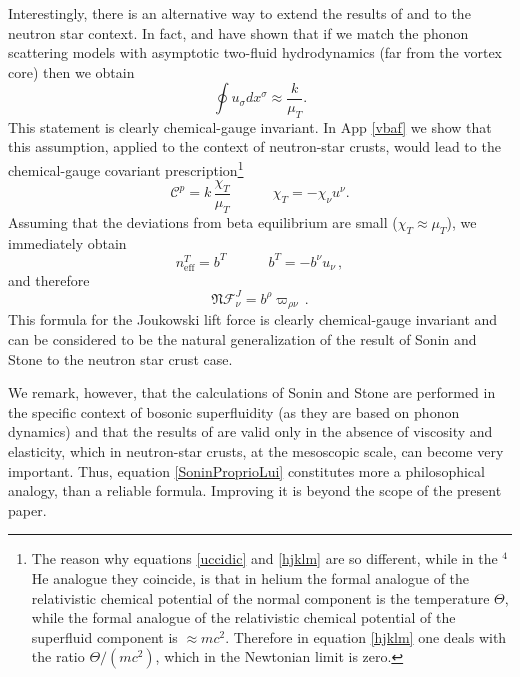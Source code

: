\documentclass[preprints,article,accept,moreauthors,pdftex]{mdpi}
\newcommand{\spc}{\quad \quad \quad}
\begin{document}
Interestingly, there is an alternative way to extend the results of \citet{sonin1997PhRvB} and \citet{stone2000} to the neutron star context. In fact, \citet{Geurst1997} and \citet{sourie2020IJMPB} have shown that if we match the phonon scattering models with asymptotic two-fluid hydrodynamics (far from the vortex core) then we obtain
\begin{equation}\label{kinetoBob}
 \oint u_\sigma dx^\sigma \approx \dfrac{k}{\mu_T}.
\end{equation}
This statement is clearly chemical-gauge invariant. In App \ref{vbaf} we show that this assumption, applied to the context of neutron-star crusts, would lead to the chemical-gauge covariant prescription\footnote{The reason why equations \eqref{uccidic} and \eqref{hjklm} are so different, while in the $^4$He analogue they coincide, is that in helium the formal analogue of the relativistic chemical potential of the normal component is the temperature $\Theta$, while the formal analogue of the relativistic chemical potential of the superfluid component is $\approx mc^2$. Therefore in equation \eqref{hjklm} one deals with the ratio $\Theta/(mc^2)$, which in the Newtonian limit is zero.}
\begin{equation}\label{hjklm}
    \mathcal{C}^p =  k \, \dfrac{\chi_T}{\mu_T}  \spc  \chi_T = - \chi_\nu u^\nu.
\end{equation}
Assuming that the deviations from beta equilibrium are small ($\chi_T \approx \mu_T$), we immediately obtain
\begin{equation}
n^T_{\text{eff}} = b^T  \spc b^T =-b^\nu u_\nu \, ,
\end{equation}
and therefore
\begin{equation}\label{SoninProprioLui}
\mathfrak{N} \mathcal{F}^J_\nu = b^\rho \varpi_{\rho \nu} \, .
\end{equation}
This formula for the Joukowski lift force is clearly chemical-gauge invariant and can be considered to be the natural generalization of the result  of Sonin and Stone to the neutron star crust case. 

We remark, however, that the calculations of Sonin and Stone are performed in the specific context of bosonic superfluidity (as they are based on phonon dynamics) and that the results of \cite{Carter_Prix_Magnus} are valid only in the absence of viscosity and elasticity, which in neutron-star crusts, at the mesoscopic scale, can become very important. Thus, equation \eqref{SoninProprioLui} constitutes more a philosophical analogy, than a reliable formula. Improving it is beyond the scope of the present paper. 
\end{document}
